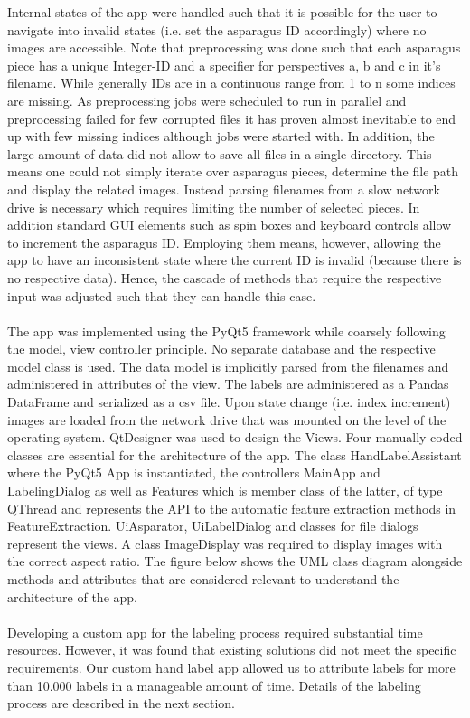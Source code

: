 Internal states of the app were handled such that it is possible for the user to navigate into invalid states (i.e. set the asparagus ID accordingly) where no images are accessible. Note that preprocessing was done such that each asparagus piece has a unique Integer-ID and a specifier for perspectives a, b and c in it’s filename. While generally IDs are in a continuous range from 1 to n some indices are missing. As preprocessing jobs were scheduled to run in parallel and preprocessing failed for few corrupted files it has proven almost inevitable to end up with few missing indices although jobs were started with. In addition, the large amount of data did not allow to save all files in a single directory. This means one could not simply iterate over asparagus pieces, determine the file path and display the related images. Instead parsing filenames from a slow network drive is necessary which requires limiting the number of selected pieces. In addition standard GUI elements such as spin boxes and keyboard controls allow to increment the asparagus ID. Employing them means, however, allowing the app to have an inconsistent state where the current ID is invalid (because there is no respective data). Hence, the cascade of methods that require the respective input was adjusted such that they can handle this case. \\
\\
The app was implemented using the PyQt5 framework while coarsely following the model, view controller principle. No separate database and the respective model class is used. The data model is implicitly parsed from the filenames and administered in attributes of the view. The labels are administered as a Pandas DataFrame and serialized as a csv file. Upon state change (i.e. index increment) images are loaded from the network drive that was mounted on the level of the operating system. QtDesigner was used to design the Views. Four manually coded classes are essential for the architecture of the app. The class HandLabelAssistant where the PyQt5 App is instantiated, the controllers MainApp and LabelingDialog as well as Features which is member class of the latter, of type QThread and represents the API to the automatic feature extraction methods in FeatureExtraction. Ui\textunderscore Asparator, UiLabelDialog and classes for file dialogs represent the views. A class ImageDisplay was required to display images with the correct aspect ratio. The figure below shows the UML class diagram alongside methods and attributes that are considered relevant to understand the architecture of the app. \\
\\
Developing a custom app for the labeling process required substantial time resources. However, it was found that existing solutions did not meet the specific requirements. Our custom hand label app allowed us to attribute labels for more than 10.000 labels in a manageable amount of time. Details of the labeling process are described in the next section.

